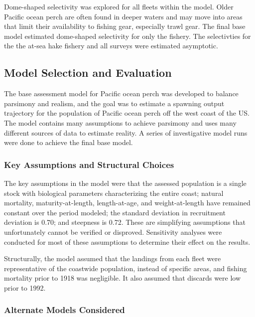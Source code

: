 \documentclass[12pt,]{article}
\begin{document}
Dome-shaped selectivity was explored for all fleets within the model.
Older Pacific ocean perch are often found in deeper waters and may move
into areas that limit their availability to fishing gear, especially
trawl gear. The final base model estimated dome-shaped selectivity for
only the fishery. The selectivties for the the at-sea hake fishery and
all surveys were estimated asymptotic.

\subsection{Model Selection and
Evaluation}\label{model-selection-and-evaluation}

The base assessment model for Pacific ocean perch was developed to
balance parsimony and realism, and the goal was to estimate a spawning
output trajectory for the population of Pacific ocean perch off the west
coast of the US. The model contains many assumptions to achieve
parsimony and uses many different sources of data to estimate reality. A
series of investigative model runs were done to achieve the final base
model.

\subsubsection{Key Assumptions and Structural
Choices}\label{key-assumptions-and-structural-choices}

The key assumptions in the model were that the assessed population is a
single stock with biological parameters characterizing the entire coast;
natural mortality, maturity-at-length, length-at-age, and
weight-at-length have remained constant over the period modeled; the
standard deviation in recruitment deviation is 0.70; and steepness is
0.72. These are simplifying assumptions that unfortunately cannot be
verified or disproved. Sensitivity analyses were conducted for most of
these assumptions to determine their effect on the results.

Structurally, the model assumed that the landings from each fleet were
representative of the coastwide population, instead of specific areas,
and fishing mortality prior to 1918 was negligible. It also assumed that
discards were low prior to 1992.

\subsubsection{Alternate Models
Considered}\label{alternate-models-considered}
\end{document}
